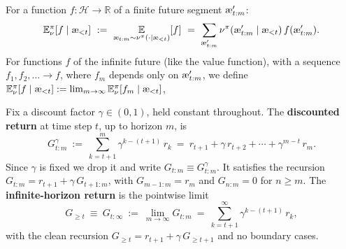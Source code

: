 \documentclass[fontsize=11pt, parskip=half]{scrartcl}
\newcommand{\cH}{\mathcal{H}}
\newcommand{\Ex}{\mathbb{E}}
\newcommand{\aes}{\textnormal{\ae}}
\begin{document}
\begin{definition}[Expectation $\Ex_\nu^\pi$]\label{def:expectation}
For a function $f : \cH \to \mathbb{R}$ of a finite future segment $\aes'_{t:m}$:
\[
    \Ex_\nu^\pi[f \mid \aes_{<t}]
    ~:=~ \underset{\aes_{t:m} \sim \nu^\pi(\cdot \mid \aes_{<t})}{\Ex} [f]
    ~=~ \sum_{\aes'_{t:m}} \nu^\pi(\aes'_{t:m} \mid \aes_{<t})\, f(\aes'_{t:m}).
\]
For functions $f$ of the infinite future (like the value function), with a sequence $f_1, f_2, \ldots \to f$, where $f_m$ depends only on $\aes'_{t:m}$, we define $\Ex_\nu^\pi[f \mid \aes_{<t}] := \lim_{m \to \infty} \Ex_\nu^\pi[f_m \mid \aes_{<t}]$, 
\end{definition}

\begin{definition}\label{def:return}
Fix a discount factor $\gamma \in (0,1)$, held constant throughout.
The \textbf{discounted return} at time step $t$, up to horizon $m$, is
\[
    G^\gamma_{t:m}
    ~:=~ \sum_{k=t+1}^{m} \gamma^{k-(t+1)}\, r_k
    ~=~ r_{t+1} + \gamma\, r_{t+2} + \cdots + \gamma^{m-t}\, r_m.
\]
Since $\gamma$ is fixed we drop it and write $G_{t:m} \equiv G^\gamma_{t:m}$.
It satisfies the recursion $G_{t:m} = r_{t+1} + \gamma\, G_{t+1:m}$, with $G_{m-1:m} = r_m$ and $G_{n:m} = 0$ for $n \geq m$.
The \textbf{infinite-horizon return} is the pointwise limit
\[
    G_{\geq t} ~\equiv~ G_{t:\infty} ~:=~ \lim_{m \to \infty} G_{t:m} ~=~ \sum_{k=t+1}^{\infty} \gamma^{k-(t+1)}\, r_k,
\]
with the clean recursion $G_{\geq t} = r_{t+1} + \gamma\, G_{\geq t+1}$ and no boundary cases.
\end{definition}
\end{document}

